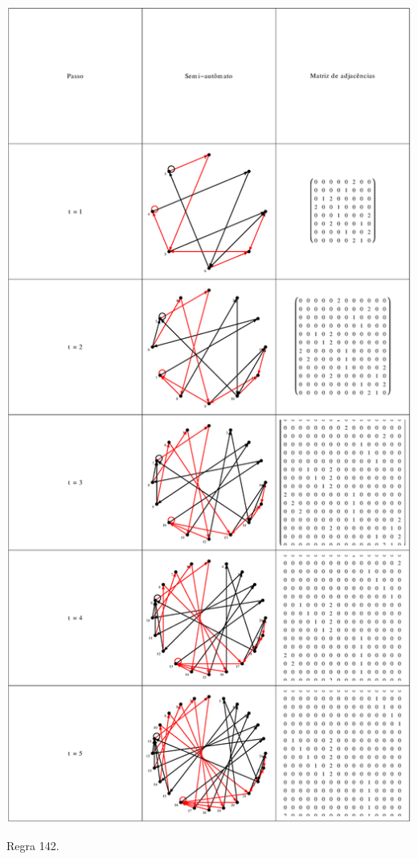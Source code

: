 \documentclass[12pt,a4paper]{article}
\begin{document}
\begin{table}[H]
\begin{center}
\includegraphics[scale=0.32]{img/mat/matr142.eps}
\caption{Regra 142.}
\label{tab:mr142}
\end{center}
\end{table}
\end{document}

